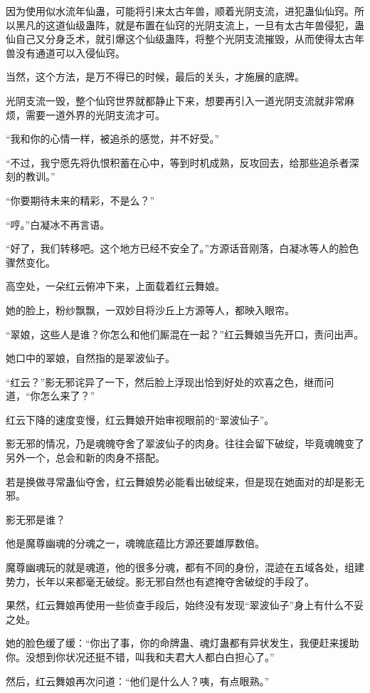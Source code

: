 \begin{this_body}
因为使用似水流年仙蛊，可能将引来太古年兽，顺着光阴支流，进犯蛊仙仙窍。所以黑凡的这道仙级蛊阵，就是布置在仙窍的光阴支流上，一旦有太古年兽侵犯，蛊仙自己又分身乏术，就引爆这个仙级蛊阵，将整个光阴支流摧毁，从而使得太古年兽没有通道可以入侵仙窍。

当然，这个方法，是万不得已的时候，最后的关头，才施展的底牌。

光阴支流一毁，整个仙窍世界就都静止下来，想要再引入一道光阴支流就非常麻烦，需要一道外界的光阴支流才可。

“我和你的心情一样，被追杀的感觉，并不好受。”

“不过，我宁愿先将仇恨积蓄在心中，等到时机成熟，反攻回去，给那些追杀者深刻的教训。”

“你要期待未来的精彩，不是么？”

“哼。”白凝冰不再言语。

“好了，我们转移吧。这个地方已经不安全了。”方源话音刚落，白凝冰等人的脸色骤然变化。

高空处，一朵红云俯冲下来，上面载着红云舞娘。

她的脸上，粉纱飘飘，一双妙目将沙丘上方源等人，都映入眼帘。

“翠娘，这些人是谁？你怎么和他们厮混在一起？”红云舞娘当先开口，责问出声。

她口中的翠娘，自然指的是翠波仙子。

“红云？”影无邪诧异了一下，然后脸上浮现出恰到好处的欢喜之色，继而问道，“你怎么来了？”

红云下降的速度变慢，红云舞娘开始审视眼前的“翠波仙子”。

影无邪的情况，乃是魂魄夺舍了翠波仙子的肉身。往往会留下破绽，毕竟魂魄变了另外一个，总会和新的肉身不搭配。

若是换做寻常蛊仙夺舍，红云舞娘势必能看出破绽来，但是现在她面对的却是影无邪。

影无邪是谁？

他是魔尊幽魂的分魂之一，魂魄底蕴比方源还要雄厚数倍。

魔尊幽魂玩的就是魂道，他的很多分魂，都有不同的身份，混迹在五域各处，组建势力，长年以来都毫无破绽。影无邪自然也有遮掩夺舍破绽的手段了。

果然，红云舞娘再使用一些侦查手段后，始终没有发现“翠波仙子”身上有什么不妥之处。

她的脸色缓了缓：“你出了事，你的命牌蛊、魂灯蛊都有异状发生，我便赶来援助你。没想到你状况还挺不错，叫我和夫君大人都白白担心了。”

然后，红云舞娘再次问道：“他们是什么人？咦，有点眼熟。”


\end{this_body}
